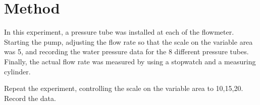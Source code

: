 \section{Method}
In this experiment, a pressure tube was installed at each of the flowmeter.
Starting the pump, adjusting the flow rate so that the scale on the variable area was 5,
and recording the water pressure data for the 8 different pressure tubes.
Finally, the actual flow rate was measured by using a stopwatch and a measuring cylinder.

Repeat the experiment, controlling the scale on the variable area to 10,15,20. Record the data.













